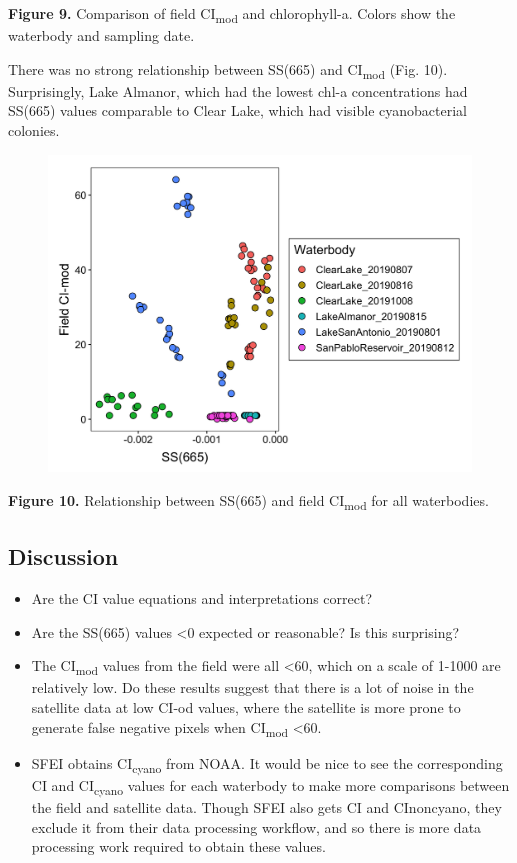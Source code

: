 \documentclass[]{article}
\begin{document}
\textbf{Figure 9.} Comparison of field CI\textsubscript{mod} and
chlorophyll-a. Colors show the waterbody and sampling date.

There was no strong relationship between SS(665) and
CI\textsubscript{mod} (Fig. 10). Surprisingly, Lake Almanor, which had
the lowest chl-a concentrations had SS(665) values comparable to Clear
Lake, which had visible cyanobacterial colonies.

\begin{figure}

{\centering \includegraphics[width=0.6\linewidth]{../Data/Figures_output/ss665_CImod} 

}

\end{figure}

\textbf{Figure 10.} Relationship between SS(665) and field
CI\textsubscript{mod} for all waterbodies.

\subsection{\texorpdfstring{\textbf{Discussion}}{Discussion}}\label{discussion}

\begin{itemize}
\item
  Are the CI value equations and interpretations correct?
\item
  Are the SS(665) values \textless{}0 expected or reasonable? Is this
  surprising?
\item
  The CI\textsubscript{mod} values from the field were all
  \textless{}60, which on a scale of 1-1000 are relatively low. Do these
  results suggest that there is a lot of noise in the satellite data at
  low CI-od values, where the satellite is more prone to generate false
  negative pixels when CI\textsubscript{mod} \textless{}60.
\item
  SFEI obtains CI\textsubscript{cyano} from NOAA. It would be nice to
  see the corresponding CI and CI\textsubscript{cyano} values for each
  waterbody to make more comparisons between the field and satellite
  data. Though SFEI also gets CI and CInoncyano, they exclude it from
  their data processing workflow, and so there is more data processing
  work required to obtain these values.
\end{itemize}
\end{document}
